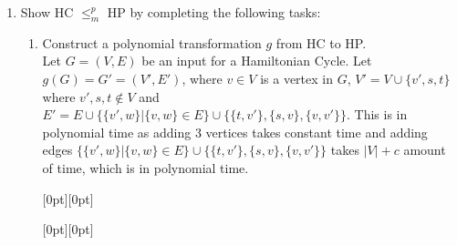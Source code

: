 \documentclass[11pt,a4paper]{article}
\newcommand{\hc} {HC}
\newcommand{\hp} {HP}
\begin{document}
\begin{enumerate}
\begin{enumerate}
            
        \end{enumerate}
    \item Show \hc{} $\leq^p_m$ \hp{} by completing the following tasks: 
    \begin{enumerate}
        \item Construct a polynomial transformation $g$ from \hc{} to \hp{}.\\
        Let $G = (V, E)$ be an input for a Hamiltonian Cycle. Let $g(G) = G'  = (V', E')$,
             where $v \in V$ is a vertex in $G$, $V' = V \cup \{v', s, t\}$  where $v', s, t \notin V$ and $E' = E \cup \{ \{v',w\} | \{v, w\} \in E \} \cup \{ \{ t, v' \}, \{s, v\}, \{v, v'\} \}$.
             This is in polynomial time as adding 3 vertices takes constant time and adding edges $\{ \{v',w\} | \{v, w\} \in E \} \cup \{ \{ t, v' \}, \{s, v\}, \{v, v'\} \}$
            takes $|V| + c$ amount of time, which is in polynomial time. \\
            \begin{center}
            \raisebox{5mm}[0pt][0pt]{
        }
        \raisebox{20mm}[0pt][0pt]{%
                \makebox[1em][c]{$\Rightarrow$}}
\end{center}
\end{enumerate}
\end{enumerate}
\end{document}
